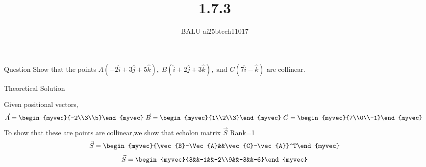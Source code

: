 \documentclass{beamer}
\title %
{1.7.3}
\author %
{BALU-ai25btech11017}
\begin{document}
\frame{\titlepage}
\begin{frame}{Question}
Show that the points $A(-2\hat{i} + 3\hat{j} + 5\hat{k}), \; 
B(\hat{i} + 2\hat{j} + 3\hat{k}), \; 
\text{and } C(7\hat{i} - \hat{k})$ are collinear.\\ 
\end{frame}



\begin{frame}{Theoretical Solution}

Given positional vectors,
\begin{align}
     \vec{A}=\begin{myvec}{-2\\3\\5}\end{myvec}\;
    \vec{B}=\begin{myvec}{1\\2\\3}\end{myvec}\;
    \vec{C}=\begin{myvec}{7\\0\\-1}\end{myvec}\
\end{align}
To show that these are points are collinear,we show that echolon matrix $\vec{S}$ Rank=1\\

\begin{align}
    \vec{S}=\begin{myvec}{\vec{B}-\Vec{A}&&\vec{C}-\vec{A}}^T\end{myvec}
\end{align}
\begin{align}
     \vec{S}=\begin{myvec}{3&&-1&&-2\\9&&-3&&-6}\end{myvec}
\end{align}


\end{frame}
\end{document}

